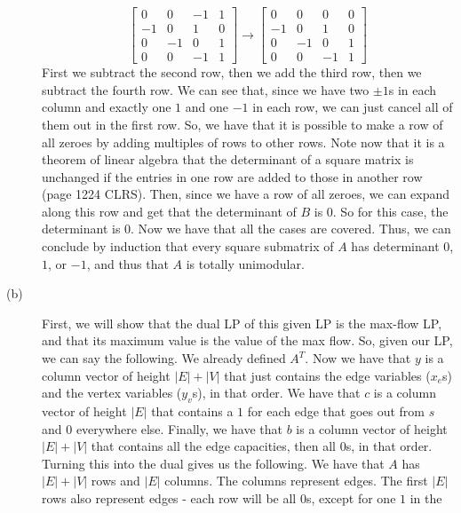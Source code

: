 \documentclass{article}
\begin{document}
\begin{description}
\[\begin{bmatrix}
         0 & 0 & -1 & 1\\
        -1 & 0 & 1 & 0\\
         0 & -1 & 0 & 1\\
         0 & 0 & -1 & 1
        \end{bmatrix} \rightarrow
        \begin{bmatrix}
         0 & 0 & 0 & 0\\
        -1 & 0 & 1 & 0\\
         0 & -1 & 0 & 1\\
         0 & 0 & -1 & 1
        \end{bmatrix}
        \]
        First we subtract the second row, then we add the third row, then we
        subtract the fourth row. We can see that, since we have two $\pm1$s in
        each column and exactly one $1$ and one $-1$ in each row,
        we can just cancel all of them out in the first row.
        So, we have that it is possible to make a row of all zeroes by adding
        multiples of rows to other rows. Note now that it is a theorem of linear
        algebra that the determinant of a square matrix is unchanged if the
        entries in one row are added to those in another row (page 1224 CLRS).
        Then, since we have a row of all zeroes, we can expand along this row
        and get that the determinant of $B$ is $0$. So for this case, the determinant
        is $0$. Now we have that all the cases are covered. Thus, we can
        conclude by induction that every square submatrix of $A$ has determinant
        $0$, $1$, or $-1$, and thus that $A$ is totally unimodular.
    \item[(b)] First, we will show that the dual LP of this given LP is the
        max-flow LP, and that its maximum value is the value of the max flow.
        So, given our LP, we can say the following. We already defined $A^T$.
        Now we have that $y$ is a column vector of height $|E| + |V|$ that just contains the edge
        variables ($x_e$s) and the vertex variables ($y_v$s), in that order. We
        have that $c$ is a column vector of height $|E|$ that contains a $1$ for
        each edge that goes out from $s$ and $0$ everywhere else. Finally, we
        have that $b$ is a column vector of height $|E| + |V|$ that contains all
        the edge capacities, then all $0$s, in that order. Turning this into the
        dual gives us the following. We have that $A$ has $|E| + |V|$ rows and
        $|E|$ columns. The columns represent edges. The first $|E|$ rows also
        represent edges - each row will be all $0$s, except for one $1$ in the

\end{description}
\end{document}
